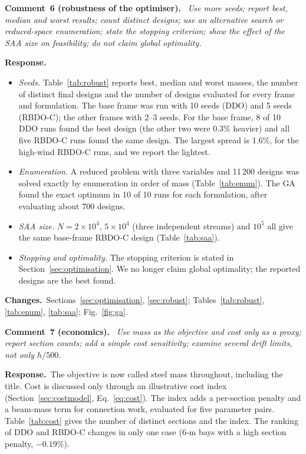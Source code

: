 \documentclass[11pt]{article}
\newcounter{rc}
\newenvironment{comment}[1]{\refstepcounter{rc}\par\medskip\noindent\textbf{Comment~#1.}\ \itshape}{\par}
\newcommand{\resp}{\par\noindent\textbf{Response.}\ }
\newcommand{\chg}{\par\noindent\textbf{Changes.}\ }
\begin{document}
\begin{comment}{6 (robustness of the optimiser)}
Use more seeds; report best, median and worst results; count distinct designs; use an alternative
search or reduced-space enumeration; state the stopping criterion; show the effect of the SAA size on
feasibility; do not claim global optimality.
\end{comment}
\resp
\begin{itemize}[itemsep=0.1em]
\item \emph{Seeds.} Table~\ref{tab:robust} reports best, median and worst masses, the number of
distinct final designs and the number of designs evaluated for every frame and formulation. The base
frame was run with 10 seeds (DDO) and 5 seeds (RBDO-C); the other frames with 2--3 seeds. For the base
frame, 8 of 10 DDO runs found the best design (the other two were 0.3\% heavier) and all five RBDO-C
runs found the same design. The largest spread is 1.6\%, for the high-wind RBDO-C runs, and we report
the lightest.
\item \emph{Enumeration.} A reduced problem with three variables and 11\,200 designs was solved
exactly by enumeration in order of mass (Table~\ref{tab:enum}). The GA found the exact optimum in 10 of
10 runs for each formulation, after evaluating about 700 designs.
\item \emph{SAA size.} $N=2\times10^4$, $5\times10^4$ (three independent streams) and $10^5$ all give
the same base-frame RBDO-C design (Table~\ref{tab:saa}).
\item \emph{Stopping and optimality.} The stopping criterion is stated in
Section~\ref{sec:optimisation}. We no longer claim global optimality; the reported designs are the
best found.
\end{itemize}
\chg Sections~\ref{sec:optimisation}, \ref{sec:robust}; Tables~\ref{tab:robust}, \ref{tab:enum},
\ref{tab:saa}; Fig.~\ref{fig:ga}.

\begin{comment}{7 (economics)}
Use mass as the objective and cost only as a proxy; report section counts; add a simple cost
sensitivity; examine several drift limits, not only $h/500$.
\end{comment}
\resp The objective is now called steel mass throughout, including the title. Cost is discussed only
through an illustrative cost index (Section~\ref{sec:costmodel}, Eq.~\eqref{eq:cost}). The index adds
a per-section penalty and a beam-mass term for connection work, evaluated for five parameter pairs.
Table~\ref{tab:cost} gives the number of distinct sections and the index. The ranking of DDO and
RBDO-C changes in only one case (6-m bays with a high section penalty, $-0.19$\%).
\end{document}
